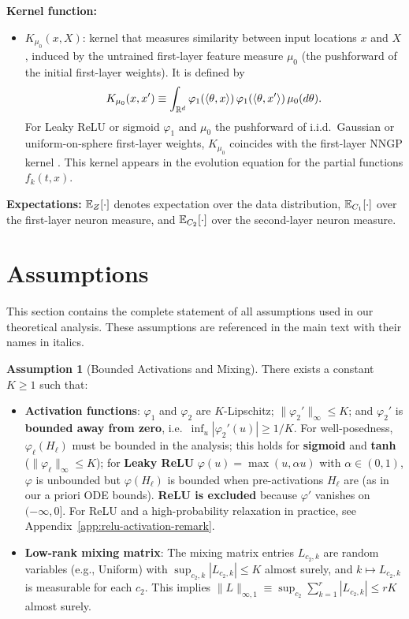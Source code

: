 \documentclass[nohyperref]{article}
\theoremstyle{plain}
\theoremstyle{definition}
\newtheorem{assumption}[theorem]{Assumption}
\theoremstyle{remark}
\begin{document}
\textbf{Kernel function:}
\begin{itemize}
\item $K_{\mu_0}(x,X)$: kernel that measures similarity between input locations $x$ and $X$, induced by the untrained first-layer feature measure $\mu_0$ (the pushforward of the initial first-layer weights). It is defined by
\[
K_{\mu_0}(x,x') \equiv \int_{\R^d}\varphi_1(\ip{\theta}{x})\,\varphi_1(\ip{\theta}{x'})\,\mu_0(d\theta).
\]
For Leaky ReLU or sigmoid $\varphi_1$ and $\mu_0$ the pushforward of i.i.d.\ Gaussian or uniform-on-sphere first-layer weights, $K_{\mu_0}$ coincides with the first-layer NNGP kernel \cite{jacot2018neural}. This kernel appears in the evolution equation for the partial functions $f_k(t,x)$.
\end{itemize}

\textbf{Expectations:} $\mathbb{E}_Z[\cdot]$ denotes expectation over the data distribution, $\mathbb{E}_{C_1}[\cdot]$ over the first-layer neuron measure, and $\mathbb{E}_{C_2}[\cdot]$ over the second-layer neuron measure.





\section{Assumptions}
\label{app:assumptions}

This section contains the complete statement of all assumptions used in our theoretical analysis. These assumptions are referenced in the main text with their names in italics.

\begin{assumption}[Bounded Activations and Mixing]
\label{assump:regularity}
There exists a constant $K\ge 1$ such that:
\begin{itemize}
\item \textbf{Activation functions}: $\varphi_1$ and $\varphi_2$ are $K$-Lipschitz; $\|\varphi_2'\|_\infty\le K$; and $\varphi_2'$ is \textbf{bounded away from zero}, i.e.\ $\inf_u |\varphi_2'(u)|\ge 1/K$. For well-posedness, $\varphi_\ell(H_\ell)$ must be bounded in the analysis; this holds for \textbf{sigmoid} and \textbf{tanh} ($\|\varphi_\ell\|_\infty\le K$); for \textbf{Leaky ReLU} $\varphi(u)=\max(u,\alpha u)$ with $\alpha\in(0,1)$, $\varphi$ is unbounded but $\varphi(H_\ell)$ is bounded when pre-activations $H_\ell$ are (as in our a priori ODE bounds). \textbf{ReLU is excluded} because $\varphi'$ vanishes on $(-\infty,0]$. For ReLU and a high-probability relaxation in practice, see Appendix~\ref{app:relu-activation-remark}.
\item \textbf{Low-rank mixing matrix}: The mixing matrix entries $L_{c_2,k}$ are random variables (e.g., Uniform) with $\sup_{c_2,k}|L_{c_2,k}|\le K$ almost surely, and $k\mapsto L_{c_2,k}$ is measurable for each $c_2$. This implies $\|L\|_{\infty,1}\equiv \sup_{c_2}\sum_{k=1}^r |L_{c_2,k}|\le rK$ almost surely.
\end{itemize}
\end{assumption}
\end{document}
